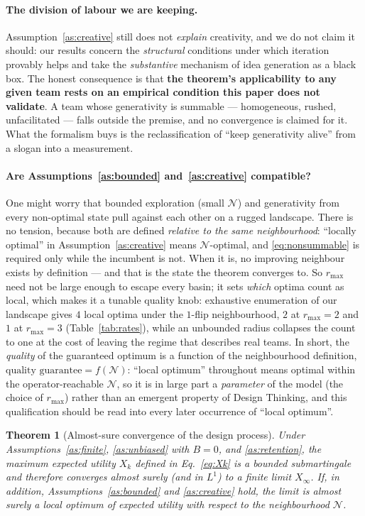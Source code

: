 \documentclass[11pt]{article}
\newtheorem{theorem}{Theorem}
\begin{document}
\paragraph{The division of labour we are keeping.} Assumption~\ref{as:creative} still does not \emph{explain} creativity, and we do not claim it should: our results concern the \emph{structural} conditions under which iteration provably helps and take the \emph{substantive} mechanism of idea generation as a black box. The honest consequence is that \textbf{the theorem's applicability to any given team rests on an empirical condition this paper does not validate}. A team whose generativity is summable --- homogeneous, rushed, unfacilitated --- falls outside the premise, and no convergence is claimed for it. What the formalism buys is the reclassification of ``keep generativity alive'' from a slogan into a measurement.

\paragraph{Are Assumptions~\ref{as:bounded} and~\ref{as:creative} compatible?} One might worry that bounded exploration (small $\mathcal{N}$) and generativity from every non-optimal state pull against each other on a rugged landscape. There is no tension, because both are defined \emph{relative to the same neighbourhood}: ``locally optimal'' in Assumption~\ref{as:creative} means $\mathcal{N}$-optimal, and \eqref{eq:nonsummable} is required only while the incumbent is not. When it is, no improving neighbour exists by definition --- and that is the state the theorem converges to. So $r_{\max}$ need not be large enough to escape every basin; it sets \emph{which} optima count as local, which makes it a tunable quality knob: exhaustive enumeration of our landscape gives $4$ local optima under the $1$-flip neighbourhood, $2$ at $r_{\max}=2$ and $1$ at $r_{\max}=3$ (Table~\ref{tab:rates}), while an unbounded radius collapses the count to one at the cost of leaving the regime that describes real teams. In short, the \emph{quality} of the guaranteed optimum is a function of the neighbourhood definition, $\text{quality guarantee}=f(\mathcal N)$: ``local optimum'' throughout means optimal within the operator-reachable $\mathcal N$, so it is in large part a \emph{parameter} of the model (the choice of $r_{\max}$) rather than an emergent property of Design Thinking, and this qualification should be read into every later occurrence of ``local optimum''.

\begin{theorem}[Almost-sure convergence of the design process]
\label{thm:converge}
Under Assumptions~\textup{\ref{as:finite}}, \textup{\ref{as:unbiased}} with $B=0$, and \textup{\ref{as:retention}}, the maximum expected utility $X_k$ defined in Eq.~\eqref{eq:Xk} is a bounded submartingale and therefore converges almost surely (and in $L^1$) to a finite limit $X_\infty$. If, in addition, Assumptions~\textup{\ref{as:bounded}} and \textup{\ref{as:creative}} hold, the limit is almost surely a \emph{local} optimum of expected utility with respect to the neighbourhood $\mathcal{N}$.
\end{theorem}
\end{document}
